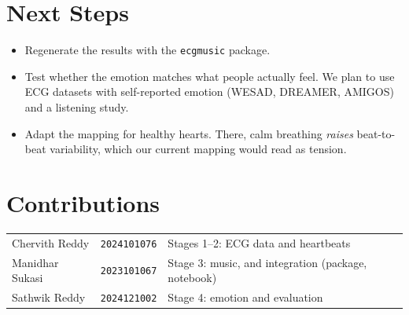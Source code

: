 \documentclass[11pt,a4paper]{article}
\begin{document}
\section{Next Steps}
\begin{itemize}
  \item Regenerate the results with the \texttt{ecgmusic} package.
  \item Test whether the emotion matches what people actually feel. We plan to use ECG datasets
    with self-reported emotion (WESAD, DREAMER, AMIGOS) and a listening study.
  \item Adapt the mapping for healthy hearts. There, calm breathing \emph{raises} beat-to-beat
    variability, which our current mapping would read as tension.
\end{itemize}

\section{Contributions}
\begin{tabular}{@{}lll@{}}
Chervith Reddy  & \texttt{2024101076} & Stages 1--2: ECG data and heartbeats\\
Manidhar Sukasi & \texttt{2023101067} & Stage 3: music, and integration (package, notebook)\\
Sathwik Reddy   & \texttt{2024121002} & Stage 4: emotion and evaluation\\
\end{tabular}
\end{document}
